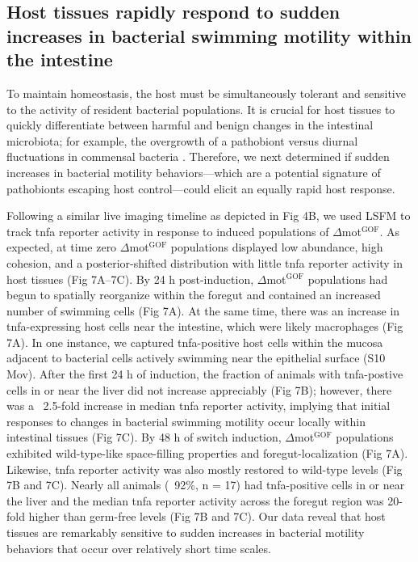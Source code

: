{{{{{{\subsection{Host tissues rapidly respond to sudden increases in bacterial swimming motility within the intestine} 
To maintain homeostasis, the host must be simultaneously tolerant and sensitive to the activity of resident bacterial populations. It is crucial for host tissues to quickly differentiate between harmful and benign changes in the intestinal microbiota; for example, the overgrowth of a pathobiont versus diurnal fluctuations in commensal bacteria \cite{thaiss_microbiota_2016}. Therefore, we next determined if sudden increases in bacterial motility behaviors—which are a potential signature of pathobionts escaping host control—could elicit an equally rapid host response. 

Following a similar live imaging timeline as depicted in Fig 4B, we used LSFM to track tnfa reporter activity in response to induced populations of $\Delta$mot$^{\text{GOF}}$. As expected, at time zero $\Delta$mot$^{\text{GOF}}$ populations displayed low abundance, high cohesion, and a posterior-shifted distribution with little tnfa reporter activity in host tissues (Fig 7A–7C). By 24 h post-induction, $\Delta$mot$^{\text{GOF}}$ populations had begun to spatially reorganize within the foregut and contained an increased number of swimming cells (Fig 7A). At the same time, there was an increase in tnfa-expressing host cells near the intestine, which were likely macrophages (Fig 7A). In one instance, we captured tnfa-positive host cells within the mucosa adjacent to bacterial cells actively swimming near the epithelial surface (S10 Mov). After the first 24 h of induction, the fraction of animals with tnfa-postive cells in or near the liver did not increase appreciably (Fig 7B); however, there was a ~2.5-fold increase in median tnfa reporter activity, implying that initial responses to changes in bacterial swimming motility occur locally within intestinal tissues (Fig 7C). By 48 h of switch induction, $\Delta$mot$^{\text{GOF}}$ populations exhibited wild-type-like space-filling properties and foregut-localization (Fig 7A). Likewise, tnfa reporter activity was also mostly restored to wild-type levels (Fig 7B and 7C). Nearly all animals (~92\%, n = 17) had tnfa-positive cells in or near the liver and the median tnfa reporter activity across the foregut region was 20-fold higher than germ-free levels (Fig 7B and 7C). Our data reveal that host tissues are remarkably sensitive to sudden increases in bacterial motility behaviors that occur over relatively short time scales. 

}}}}}}
